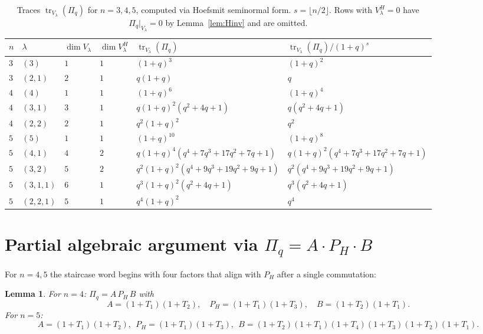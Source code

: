 \documentclass[11pt]{article}
\newtheorem{lemma}[theorem]{Lemma}
\theoremstyle{definition}
\newcommand{\Pq}{\Pi_q}
\newcommand{\PH}{P_H}
\newcommand{\tr}{\operatorname{tr}}
\begin{document}
\begin{table}[hp]
\centering
\caption{Traces $\tr_{V_\lambda}(\Pq)$ for $n=3,4,5$, computed via
Hoefsmit seminormal form. $s=\lfloor n/2\rfloor$. Rows with
$V_\lambda^H=0$ have $\Pq|_{V_\lambda}=0$ by Lemma~\ref{lem:Hinv} and are
omitted.}
\label{tab:traces}
\small
\begin{tabular}{llllll}
\toprule
$n$ & $\lambda$ & $\dim V_\lambda$ & $\dim V_\lambda^H$ &
  $\tr_{V_\lambda}(\Pq)$ & $\tr_{V_\lambda}(\Pq)/(1+q)^s$ \\
\midrule
$3$ & $(3)$     & $1$ & $1$ & $(1+q)^3$ & $(1+q)^2$ \\
$3$ & $(2,1)$   & $2$ & $1$ & $q(1+q)$ & $q$ \\
\midrule
$4$ & $(4)$     & $1$ & $1$ & $(1+q)^6$ & $(1+q)^4$ \\
$4$ & $(3,1)$   & $3$ & $1$ & $q(1+q)^2(q^2+4q+1)$ & $q(q^2+4q+1)$ \\
$4$ & $(2,2)$   & $2$ & $1$ & $q^2(1+q)^2$ & $q^2$ \\
\midrule
$5$ & $(5)$     & $1$ & $1$ & $(1+q)^{10}$ & $(1+q)^8$ \\
$5$ & $(4,1)$   & $4$ & $2$ & $q(1+q)^4(q^4+7q^3+17q^2+7q+1)$
                & $q(1+q)^2(q^4+7q^3+17q^2+7q+1)$ \\
$5$ & $(3,2)$   & $5$ & $2$ & $q^2(1+q)^2(q^4+9q^3+19q^2+9q+1)$
                & $q^2(q^4+9q^3+19q^2+9q+1)$ \\
$5$ & $(3,1,1)$ & $6$ & $1$ & $q^3(1+q)^2(q^2+4q+1)$ & $q^3(q^2+4q+1)$ \\
$5$ & $(2,2,1)$ & $5$ & $1$ & $q^4(1+q)^2$ & $q^4$ \\
\bottomrule
\end{tabular}
\end{table}

\section{Partial algebraic argument via $\Pq=A\cdot\PH\cdot B$}

For $n=4,5$ the staircase word begins with four factors that align with
$\PH$ after a single commutation:

\begin{lemma}\label{lem:APHB}
For $n=4$: $\Pq=A\,\PH\,B$ with
\[
  A=(1+T_1)(1+T_2),\quad
  \PH=(1+T_1)(1+T_3),\quad
  B=(1+T_2)(1+T_1).
\]
For $n=5$:
\[
  A=(1+T_1)(1+T_2),\ \
  \PH=(1+T_1)(1+T_3),\ \
  B=(1+T_2)(1+T_1)(1+T_4)(1+T_3)(1+T_2)(1+T_1).
\]
\end{lemma}
\end{document}
